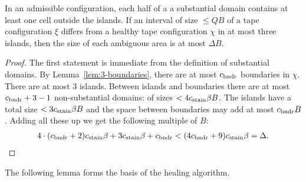 \documentclass[11pt]{memoir}
\theoremstyle{definition} %
\renewcommand{\le}{\leq}
\def\B{B}
\newcommand{\Q}{Q} %
\newcommand{\cns}[1]{c_{\textrm{\upshape #1}}}
\newcommand{\CBoundaries}{\cns{bndr}}
\newcommand{\CStain}{\cns{stain}}
\begin{document}
\begin{lemma}\label{lem:ambiguous}
In an admissible configuration, each half of a 
a substantial domain contains at least one cell outside the islands.
If an interval of size \( \le  \Q\B \) of a tape configuration \( \xi \) differs from a  healthy tape 
configuration \( \chi \) in at most three islands, then 
the size of each ambiguous area is at most \( \Delta\B \).
\end{lemma}
\begin{proof}
The first statement is immediate from the definition of substantial domains.
By Lemma~\ref{lem:3-boundaries}, there are at most \( \CBoundaries \) boundaries in \( \chi \).
There are at most 3 islands.
Between islands and boundaries there are at most \( \CBoundaries+3-1 \)
non-substantial domains: of sizes \( < 4\CStain\beta\B \).
The islands have a total size \( <3\CStain\beta\B \) and the space between boundaries may add at
most \( \CBoundaries\B \).
Adding all these up we get the following multiple of \( \B \):
\begin{align*}
  4\cdot(\CBoundaries+2)\CStain\beta + 3\CStain\beta + \CBoundaries
  < (4 \CBoundaries+9)\CStain\beta = \Delta.
\end{align*}

\end{proof}

The following lemma forms the basis of the healing algorithm.
\end{document}
